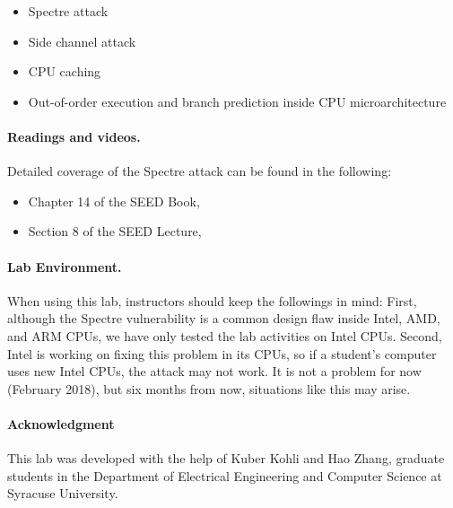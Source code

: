 \begin{itemize}[noitemsep]
\item Spectre attack
\item Side channel attack
\item CPU caching
\item Out-of-order execution and branch prediction  
      inside CPU microarchitecture
\end{itemize}



\paragraph{Readings and videos.}
Detailed coverage of the Spectre attack can be found in the following:

\begin{itemize}
\item Chapter 14 of the SEED Book, \seedbook
\item Section 8 of the SEED Lecture, \seedcsvideo
\end{itemize}


\paragraph{Lab Environment.} \seedenvironment

When using this lab, instructors should keep the followings in mind:
First, although the Spectre vulnerability
is a common design flaw inside Intel, AMD, and ARM CPUs, we have
only tested the lab activities on Intel CPUs.
Second, Intel is working on fixing this
problem in its CPUs, so if a student's computer uses new Intel CPUs, the
attack may not work. It is not a problem for now (February 2018),
but six months from now, situations like this may arise.


\paragraph{Acknowledgment} This lab was developed with the help of 
Kuber Kohli and Hao Zhang,
graduate students in the Department of
Electrical Engineering and Computer Science at Syracuse University.






